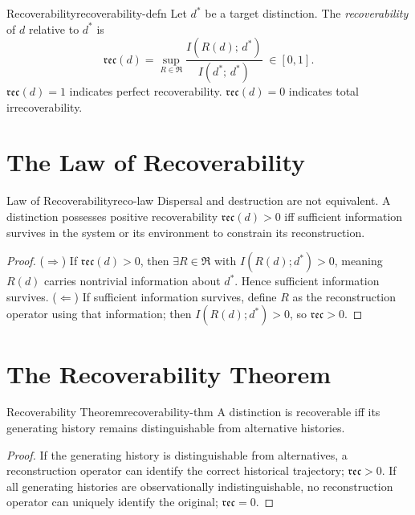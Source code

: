 \documentclass[12pt,twoside,openright]{book}
\newcommand{\reco}{\mathfrak{rec}}
\begin{document}
\begin{definition}{Recoverability}{recoverability-defn}
  Let $d^*$ be a target distinction. The
  \emph{recoverability} of $d$ relative to $d^*$ is
  \[
    \reco(d)
    = \sup_{R \in \mathfrak{R}}
      \frac{I(R(d);\, d^*)}{I(d^*;\, d^*)}
    \;\in [0, 1].
  \]
  $\reco(d) = 1$ indicates perfect recoverability.
  $\reco(d) = 0$ indicates total irrecoverability.
\end{definition}

\section{The Law of Recoverability}
\label{sec:ch5-law}

\begin{theorem}{Law of Recoverability}{reco-law}
  Dispersal and destruction are not equivalent. A
  distinction possesses positive recoverability
  $\reco(d) > 0$ iff sufficient information survives
  in the system or its environment to constrain its
  reconstruction.
\end{theorem}

\begin{proof}
  ($\Rightarrow$) If $\reco(d) > 0$, then
  $\exists R \in \mathfrak{R}$ with $I(R(d); d^*) > 0$,
  meaning $R(d)$ carries nontrivial information about
  $d^*$. Hence sufficient information survives.
  ($\Leftarrow$) If sufficient information survives,
  define $R$ as the reconstruction operator using that
  information; then $I(R(d); d^*) > 0$, so $\reco > 0$.
\end{proof}

\section{The Recoverability Theorem}
\label{sec:ch5-recov}

\begin{theorem}{Recoverability Theorem}{recoverability-thm}
  A distinction is recoverable iff its generating history
  remains distinguishable from alternative histories.
\end{theorem}

\begin{proof}
  If the generating history is distinguishable from
  alternatives, a reconstruction operator can identify
  the correct historical trajectory; $\reco > 0$.
  If all generating histories are observationally
  indistinguishable, no reconstruction operator can
  uniquely identify the original; $\reco = 0$.
\end{proof}
\end{document}
